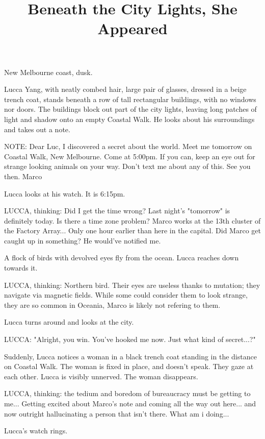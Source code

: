 \documentclass[11pt]{article}
\begin{document}
\ttfamily
\title{Beneath the City Lights, She Appeared}
\maketitle

New Melbourne coast, dusk.

Lucca Yang, with neatly combed hair, large pair of glasses, dressed in a beige trench coat, stands beneath a row of tall rectangular buildings, with no windows nor doors. 
The buildings block out part of the city lights, leaving long patches of light and shadow onto an empty Coastal Walk.
He looks about his surroundings and takes out a note.

NOTE: Dear Luc, I discovered a secret about the world. 
Meet me tomorrow on Coastal Walk, New Melbourne. Come at 5:00pm.
If you can, keep an eye out for strange looking animals on your way. 
Don't text me about any of this. See you then.
Marco

Lucca looks at his watch. It is 6:15pm. 

LUCCA, thinking: Did I get the time wrong? Last night's "tomorrow" is definitely today. 
Is there a time zone problem? Marco works at the 13th cluster of the Factory Array... Only one hour earlier than here in the capital. 
Did Marco get caught up in something? He would've notified me.

A flock of birds with devolved eyes fly from the ocean. Lucca reaches down towards it.

LUCCA, thinking: Northern bird. Their eyes are useless thanks to mutation; they navigate via magnetic fields. While some could consider them to look strange, they are so common in Oceania, Marco is likely not refering to them. 

Lucca turns around and looks at the city.

LUCCA: "Alright, you win. You've hooked me now. Just what kind of secret...?"

Suddenly, Lucca notices a woman in a black trench coat standing in the distance on Coastal Walk. The woman is fixed in place, and doesn't speak. They gaze at each other. Lucca is visibly unnerved. The woman disappears. 

LUCCA, thinking: the tedium and boredom of bureaucracy must be getting to me... Getting excited about Marco's note and coming all the way out here... and now outright hallucinating a person that isn't there. What am i doing...

Lucca's watch rings. 
\end{document}
